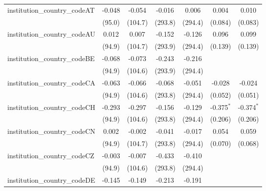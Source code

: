 \begin{tabular}{lcccccc}
   institution\_country\_codeAT          & -0.048        & -0.054        & -0.016        & 0.006         & 0.004         & 0.010\\   
                                         & (95.0)        & (104.7)       & (293.8)       & (294.4)       & (0.084)       & (0.083)\\   
   institution\_country\_codeAU          & 0.012         & 0.007         & -0.152        & -0.126        & 0.096         & 0.099\\   
                                         & (94.9)        & (104.7)       & (293.9)       & (294.4)       & (0.139)       & (0.139)\\   
   institution\_country\_codeBE          & -0.068        & -0.073        & -0.243        & -0.216        &               &   \\   
                                         & (94.9)        & (104.6)       & (293.9)       & (294.4)       &               &   \\   
   institution\_country\_codeCA          & -0.063        & -0.066        & -0.068        & -0.051        & -0.028        & -0.024\\   
                                         & (94.9)        & (104.6)       & (293.8)       & (294.4)       & (0.052)       & (0.051)\\   
   institution\_country\_codeCH          & -0.293        & -0.297        & -0.156        & -0.129        & -0.375$^{*}$  & -0.374$^{*}$\\   
                                         & (94.9)        & (104.6)       & (293.8)       & (294.4)       & (0.206)       & (0.206)\\   
   institution\_country\_codeCN          & 0.002         & -0.002        & -0.041        & -0.017        & 0.054         & 0.059\\   
                                         & (94.9)        & (104.7)       & (293.8)       & (294.4)       & (0.070)       & (0.068)\\   
   institution\_country\_codeCZ          & -0.003        & -0.007        & -0.433        & -0.410        &               &   \\   
                                         & (94.9)        & (104.6)       & (293.8)       & (294.4)       &               &   \\   
   institution\_country\_codeDE          & -0.145        & -0.149        & -0.213        & -0.191        &               &   \\   

\end{tabular}
